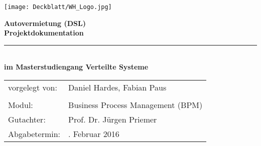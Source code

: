 \thispagestyle{plain}
\begin{titlepage}

\begin{center}

\texttt{[image: Deckblatt/WH\_Logo.jpg]}

\vspace{2cm}

\Huge{\textbf{Autovermietung (DSL)}}\\[1.5ex]
\Large{\textbf{Projektdokumentation}}
\rule{\textwidth}{0.4pt}\\[3.0ex]

\large{\textbf{im Masterstudiengang Verteilte Systeme}}\\[3.0ex]

\normalsize
\begin{tabular}{ll}\\
	vorgelegt von: 
	& \quad Daniel Hardes, Fabian Paus \\[1.2ex]
	& \quad \\[1.2ex]
	Modul:  & \quad Business Process Management (BPM) \\[1.2ex]
	Gutachter:  & \quad Prof. Dr. Jürgen Priemer \\[1.2ex]
	Abgabetermin:  & \quad 2. Februar 2016\\[1.2ex]
\end{tabular}

\end{center}

\end{titlepage}
